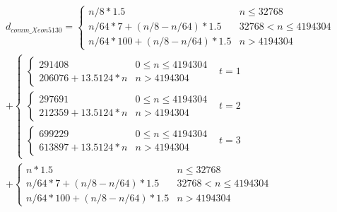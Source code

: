 \begin{equation}\label{eq:discussion9}
\begin{split}
d_{comm\_Xeon5130} = \begin{cases} n/8 * 1.5 & n \leq 32768\\n/64 * 7 + (n/8 - n/64) * 1.5 & 32768 < n \leq 4194304\\n/64 * 100 + (n/8 - n/64) * 1.5 & n > 4194304\end{cases} \\ + \begin{cases}\begin{cases}291408 & 0 \leq n \leq 4194304 \\ 206076 + 13.5124 * n & n > 4194304\end{cases} & t = 1\\\begin{cases}297691 & 0 \leq n \leq 4194304 \\ 212359 + 13.5124 * n & n > 4194304\end{cases} & t = 2\\\begin{cases}699229 & 0 \leq n \leq 4194304 \\ 613897 + 13.5124 * n & n > 4194304\end{cases} & t = 3 \end{cases} \\ + \begin{cases}n * 1.5 & n \leq 32768\\n/64 * 7 + (n/8 - n/64) * 1.5 & 32768 < n \leq 4194304\\n/64 * 100 + (n/8 - n/64) * 1.5 & n > 4194304\end{cases}
\end{split}
\end{equation}

